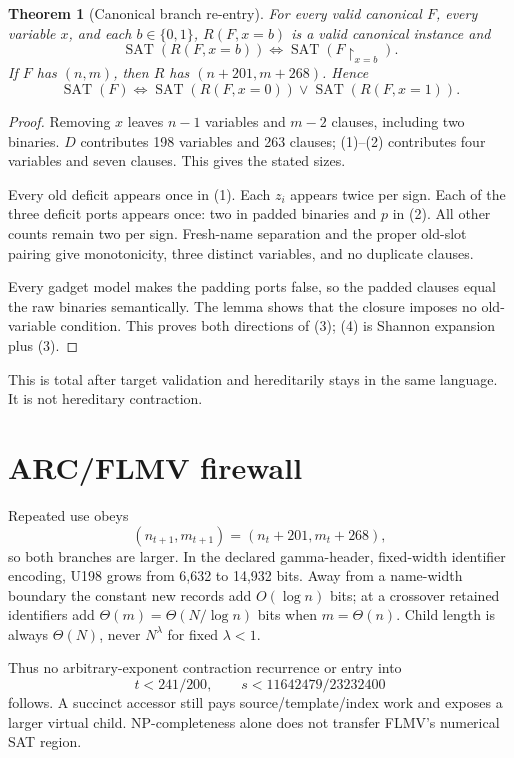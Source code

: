 \documentclass[11pt]{article}
\newtheorem{theorem}{Theorem}
\begin{document}
\begin{theorem}[Canonical branch re-entry]
For every valid canonical $F$, every variable $x$, and each $b\in\{0,1\}$, $R(F,x=b)$ is a valid canonical instance and
\[
\operatorname{SAT}(R(F,x=b))\iff
\operatorname{SAT}(F\!\upharpoonright_{x=b}).          \tag{3}
\]
If $F$ has $(n,m)$, then $R$ has $(n+201,m+268)$.  Hence
\[
\operatorname{SAT}(F)\iff
\operatorname{SAT}(R(F,x=0))\vee\operatorname{SAT}(R(F,x=1)). \tag{4}
\]
\end{theorem}
\begin{proof}
Removing $x$ leaves $n-1$ variables and $m-2$ clauses, including two binaries.  $D$ contributes 198 variables and 263 clauses; (1)--(2) contributes four variables and seven clauses.  This gives the stated sizes.

Every old deficit appears once in (1).  Each $z_i$ appears twice per sign.  Each of the three deficit ports appears once: two in padded binaries and $p$ in (2).  All other counts remain two per sign.  Fresh-name separation and the proper old-slot pairing give monotonicity, three distinct variables, and no duplicate clauses.

Every gadget model makes the padding ports false, so the padded clauses equal the raw binaries semantically.  The lemma shows that the closure imposes no old-variable condition.  This proves both directions of (3); (4) is Shannon expansion plus (3).
\end{proof}

This is total after target validation and hereditarily stays in the same language.  It is not hereditary contraction.

\section{ARC/FLMV firewall}
Repeated use obeys
\[
(n_{t+1},m_{t+1})=(n_t+201,m_t+268),                  \tag{5}
\]
so both branches are larger.  In the declared gamma-header, fixed-width identifier encoding, U198 grows from 6,632 to 14,932 bits.  Away from a name-width boundary the constant new records add $O(\log n)$ bits; at a crossover retained identifiers add $\Theta(m)=\Theta(N/\log n)$ bits when $m=\Theta(n)$.  Child length is always $\Theta(N)$, never $N^\lambda$ for fixed $\lambda<1$.

Thus no arbitrary-exponent contraction recurrence or entry into
\[
t<241/200,\qquad s<11642479/23232400
\]
follows.  A succinct accessor still pays source/template/index work and exposes a larger virtual child.  NP-completeness alone does not transfer FLMV's numerical SAT region.
\end{document}
